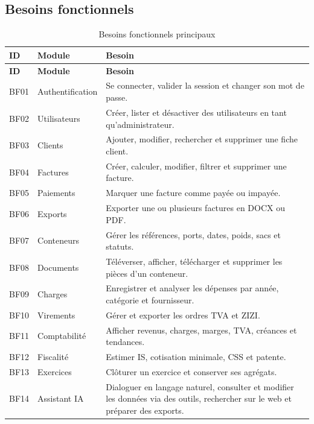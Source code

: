 \documentclass[12pt,a4paper,oneside]{report}
\begin{document}
\subsection{Besoins fonctionnels}
\begin{longtable}{p{2cm}p{4cm}p{8cm}}
\caption{Besoins fonctionnels principaux}\label{tab:bf}\\
\toprule \textbf{ID} & \textbf{Module} & \textbf{Besoin}\\ \midrule
\endfirsthead
\toprule \textbf{ID} & \textbf{Module} & \textbf{Besoin}\\ \midrule
\endhead
BF01 & Authentification & Se connecter, valider la session et changer son mot de passe.\\
BF02 & Utilisateurs & Créer, lister et désactiver des utilisateurs en tant qu'administrateur.\\
BF03 & Clients & Ajouter, modifier, rechercher et supprimer une fiche client.\\
BF04 & Factures & Créer, calculer, modifier, filtrer et supprimer une facture.\\
BF05 & Paiements & Marquer une facture comme payée ou impayée.\\
BF06 & Exports & Exporter une ou plusieurs factures en DOCX ou PDF.\\
BF07 & Conteneurs & Gérer les références, ports, dates, poids, sacs et statuts.\\
BF08 & Documents & Téléverser, afficher, télécharger et supprimer les pièces d'un conteneur.\\
BF09 & Charges & Enregistrer et analyser les dépenses par année, catégorie et fournisseur.\\
BF10 & Virements & Gérer et exporter les ordres TVA et ZIZI.\\
BF11 & Comptabilité & Afficher revenus, charges, marges, TVA, créances et tendances.\\
BF12 & Fiscalité & Estimer IS, cotisation minimale, CSS et patente.\\
BF13 & Exercices & Clôturer un exercice et conserver ses agrégats.\\
BF14 & Assistant IA & Dialoguer en langage naturel, consulter et modifier les données via des outils, rechercher sur le web et préparer des exports.\\
\bottomrule
\end{longtable}
\end{document}

